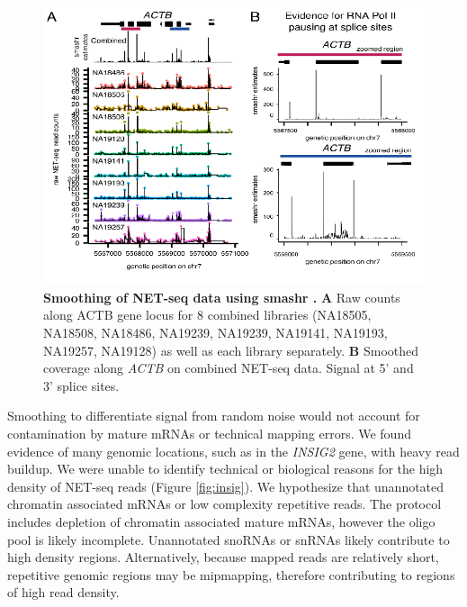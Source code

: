 \begin{figure}
\centering \includegraphics[trim=0 .3in 0
  0,clip,width=5in]{img/ch04/Figure4.pdf}
\caption[Smoothing of NET-seq data using smashr ]{\textbf{Smoothing of NET-seq data using smashr \citep{xing_flexible_2016}.} {\bf A} Raw counts along ACTB gene locus for 8 combined libraries (NA18505, NA18508, NA18486, NA19239, NA19239, NA19141, NA19193, NA19257, NA19128) as well as each library separately. {\bf B} Smoothed coverage along \emph{ACTB} on combined NET-seq data. Signal at 5' and 3' splice sites.}
\label{fig:smash}
\end{figure}
 
Smoothing to differentiate signal from random noise would not account for contamination by mature mRNAs or technical mapping errors. We found evidence of many genomic locations, such as in the \emph{INSIG2} gene, with heavy read buildup. We were unable to identify technical or biological reasons for the high density of NET-seq reads (Figure \ref{fig:insig}). We hypothesize that unannotated chromatin associated mRNAs or low complexity repetitive reads. The protocol includes depletion of chromatin associated mature mRNAs, however the oligo pool is likely incomplete. Unannotated snoRNAs or snRNAs likely contribute to high density regions. Alternatively, because mapped reads are relatively short, repetitive genomic regions may be mipmapping, therefore contributing to regions of high read density. 

